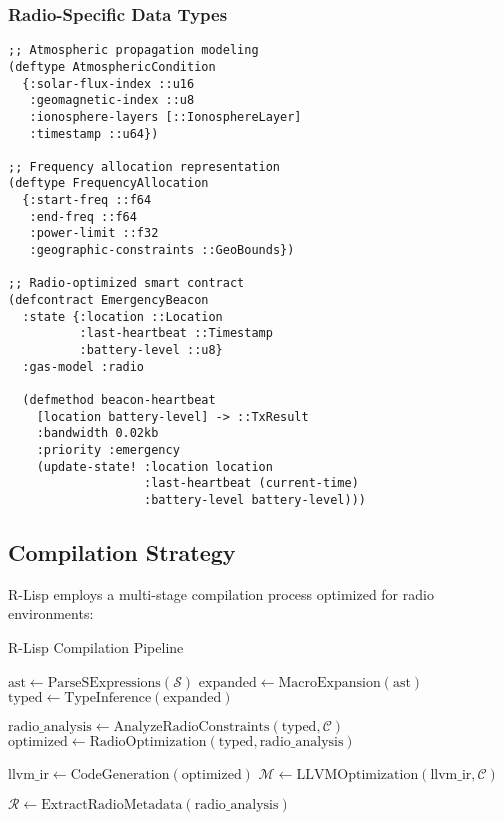 \documentclass[11pt,a4paper]{article}
\begin{document}
\subsubsection{Radio-Specific Data Types}

\begin{verbatim}
;; Atmospheric propagation modeling
(deftype AtmosphericCondition
  {:solar-flux-index ::u16
   :geomagnetic-index ::u8
   :ionosphere-layers [::IonosphereLayer]
   :timestamp ::u64})

;; Frequency allocation representation
(deftype FrequencyAllocation
  {:start-freq ::f64
   :end-freq ::f64
   :power-limit ::f32
   :geographic-constraints ::GeoBounds})

;; Radio-optimized smart contract
(defcontract EmergencyBeacon
  :state {:location ::Location 
          :last-heartbeat ::Timestamp
          :battery-level ::u8}
  :gas-model :radio
  
  (defmethod beacon-heartbeat 
    [location battery-level] -> ::TxResult
    :bandwidth 0.02kb
    :priority :emergency
    (update-state! :location location
                   :last-heartbeat (current-time)
                   :battery-level battery-level)))
\end{verbatim}

\subsection{Compilation Strategy}

R-Lisp employs a multi-stage compilation process optimized for radio environments:

\begin{algorithm}[H]
\SetAlgoLined
{}
\caption{R-Lisp Compilation Pipeline}

$\text{ast} \leftarrow \text{ParseSExpressions}(\mathcal{S})$\;
$\text{expanded} \leftarrow \text{MacroExpansion}(\text{ast})$\;
$\text{typed} \leftarrow \text{TypeInference}(\text{expanded})$\;

$\text{radio\_analysis} \leftarrow \text{AnalyzeRadioConstraints}(\text{typed}, \mathcal{C})$\;
$\text{optimized} \leftarrow \text{RadioOptimization}(\text{typed}, \text{radio\_analysis})$\;

$\text{llvm\_ir} \leftarrow \text{CodeGeneration}(\text{optimized})$\;
$\mathcal{M} \leftarrow \text{LLVMOptimization}(\text{llvm\_ir}, \mathcal{C})$\;

$\mathcal{R} \leftarrow \text{ExtractRadioMetadata}(\text{radio\_analysis})$\;
\;
\end{algorithm}
\end{document}
